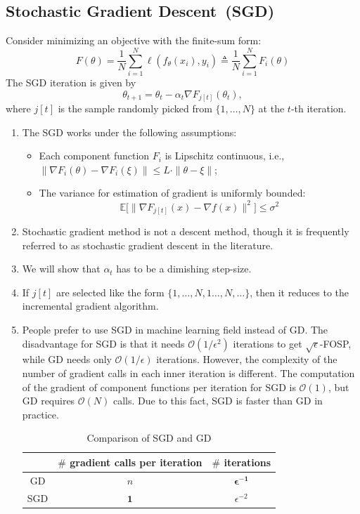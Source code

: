 \subsection{Stochastic Gradient Descent~(SGD)}
Consider minimizing an objective with the finite-sum form:
\[
F(\theta) = \frac{1}{N}\sum_{i=1}^N\ell(f_{\theta}(x_i),y_i) \triangleq \frac{1}{N}\sum_{i=1}^NF_i(\theta)
\]
The SGD iteration is given by 
\[
\theta_{t+1} = \theta_t -\alpha_t\nabla F_{j[t]}(\theta_t),
\]
where $j[t]$ is the sample randomly picked from $\{1,\dots,N\}$ at the $t$-th iteration.
\begin{remark}
\begin{enumerate}
\item
The SGD works under the following assumptions:
\begin{itemize}
\item
Each component function $F_i$ is Lipschitz continuous, i.e., $\|\nabla F_i(\theta) - \nabla F_i(\xi)\|\le L\cdot\|\theta - \xi\|$;
\item
The variance for estimation of gradient is uniformly bounded:
\[
\mathbb{E}\bigg[\|\nabla F_{j[t]}(x) - \nabla f(x)\|^2\bigg]\le\sigma^2
\]
\end{itemize}
\item
Stochastic gradient method is not a descent method, though it is frequently referred to as stochastic gradient descent in the literature.
\item
We will show that $\alpha_t$ has to be a dimishing step-size.
\item
If $j[t]$ are selected like the form $\{1,\dots,N,1\dots,N,\dots\}$, then it reduces to the incremental gradient algorithm.
\item
People prefer to use SGD in machine learning field instead of GD. 
The disadvantage for SGD is that it needs $\mathcal{O}(1/\epsilon^2)$ iterations to get $\sqrt{\epsilon}$-FOSP, while GD needs only $\mathcal{O}(1/\epsilon)$ iterations.
However, the complexity of the number of gradient calls in each inner iteration is different. 
The computation of the gradient of component functions per iteration for SGD is $\mathcal{O}(1)$, but GD requires $\mathcal{O}(N)$ calls. 
Due to this fact, SGD is faster than GD in practice.
\begin{center}
\begin{table}[H]
\centering
\begin{tabular}{|c|c|c|}
\hline
 				   & $\#$ gradient calls per iteration & $\#$ iterations   \\
 				   \hline
 GD   & $n$   &     $\bm {\epsilon^{-1}}$  \\
 \hline
 SGD   & $\bm 1$   &    $\epsilon^{-2}$  \\
  \hline
\end{tabular}
\caption{Comparison of SGD and GD
}
\end{table}
\end{center}

\end{enumerate}
\end{remark}
